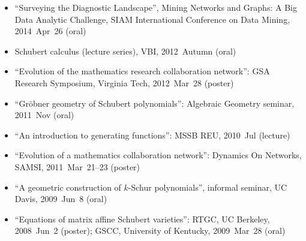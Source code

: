 \documentclass[10pt,a4paper]{article}
\begin{document}
\begin{itemize}[label=$\circ$,nolistsep]
\item
``Surveying the Diagnostic Landscape'', Mining Networks and Graphs: A Big Data Analytic Challenge, SIAM International Conference on Data Mining, 2014~Apr~26 (oral)
\item
Schubert calculus (lecture series), VBI, 2012~Autumn (oral)
\item
``Evolution of the mathematics research collaboration network'': GSA Research Symposium, Virginia Tech, 2012~Mar~28 (poster)
\item
``Gr\"obner geometry of Schubert polynomials'': Algebraic Geometry seminar, 2011~Nov (oral)
\item
``An introduction to generating functions'': MSSB REU, 2010~Jul (lecture)
\item
``Evolution of a mathematics collaboration network'': Dynamics On Networks, SAMSI, 2011~Mar~21--23 (poster)
\item
``A geometric construction of \(k\)-Schur polynomials'', informal seminar, UC Davis, 2009~Jun~8 (oral)
\item
``Equations of matrix affine Schubert varieties'': RTGC, UC Berkeley, 2008~Jun~2 (poster); GSCC, University of Kentucky, 2009~Mar~28 (oral)
\end{itemize}
\end{document}
